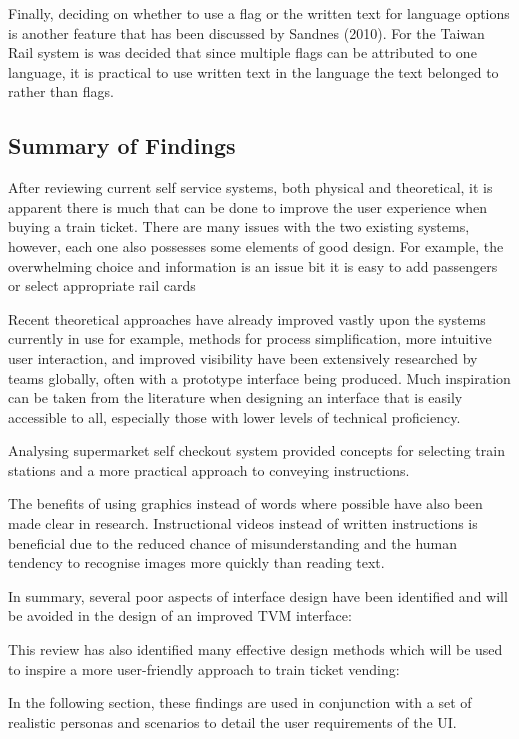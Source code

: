 Finally, deciding on whether to use a flag or the written text for language options is another feature that has been discussed by Sandnes (2010). For the Taiwan Rail system is was decided that since multiple flags can be attributed to one language, it is practical to use written text in the language the text belonged to rather than flags.

\subsection{Summary of Findings}
After reviewing current self service systems, both physical and theoretical, it is apparent there is much that can be done to improve the user experience when buying a train ticket. There are many issues with the two existing systems, however, each one also possesses some elements of good design. For example, the overwhelming choice  and information is an issue bit it is easy to add passengers or select appropriate rail cards

Recent theoretical approaches have already improved vastly upon the systems currently in use for example, methods for process simplification, more intuitive user interaction, and improved visibility have been extensively researched by teams globally, often with a prototype interface being produced. Much inspiration can be taken from the literature when designing an interface that is easily accessible to all, especially those with lower levels of technical proficiency.

Analysing supermarket self checkout system provided concepts for selecting train stations and a more practical approach to conveying instructions. 

The benefits of using graphics instead of words where possible have also been made clear in research. Instructional videos instead of written instructions is beneficial due to the reduced chance of misunderstanding and the human tendency to recognise images more quickly than reading text.

In summary, several poor aspects of interface design have been identified and will be avoided in the design of an improved TVM interface:

This review has also identified many effective design methods which will be used to inspire a more user-friendly approach to train ticket vending:

In the following section, these findings are used in conjunction with a set of realistic personas and scenarios to detail the user requirements of the UI.

